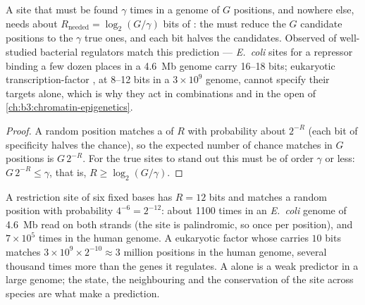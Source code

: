 \begin{proposition}\label{prop:b3:bioinformatics:bits}
A site that must be found $\gamma$ times in a genome of $G$ positions,
and nowhere else, needs about $R_{\text{needed}} = \log_{2}(G/\gamma)$
bits of : the  must reduce the $G$ candidate
positions to the $\gamma$ true ones, and each bit halves the
candidates. Observed  of well-studied bacterial regulators match
this prediction --- \emph{E.~coli} sites for a repressor binding a few
dozen places in a \qty{4.6}{Mb} genome carry \numrange{16}{18} bits;
eukaryotic transcription-factor , at \numrange{8}{12} bits in a
$3\times 10^{9}$ genome, cannot specify their targets alone, which is
why they act in combinations and in the open  of
\cref{ch:b3:chromatin-epigenetics}.
\end{proposition}
\begin{proof}
A random position matches a  of  $R$ with
probability about $2^{-R}$ (each bit of specificity halves the chance),
so the expected number of chance matches in $G$ positions is $G\,2^{-R}$.
For the true sites to stand out this must be of order $\gamma$ or less:
$G\,2^{-R} \le \gamma$, that is, $R \ge \log_{2}(G/\gamma)$.
\end{proof}

\begin{example}\label{ex:b3:bioinformatics:motif-numbers}
A restriction site of six fixed bases has $R = 12$ bits and matches a
random position with probability $4^{-6} = 2^{-12}$: about \num{1100}
times in an \emph{E.~coli} genome of \qty{4.6}{Mb} read on both strands
(the site is palindromic, so once per position), and $7\times 10^{5}$
times in the human genome. A eukaryotic factor whose  carries
$10$ bits matches $3\times 10^{9}\times 2^{-10} \approx 3$ million
positions in the human genome, several thousand times more than the
genes it regulates. A  alone is a weak predictor in a large
genome; the  state, the neighbouring  and the
conservation of the site across species are what make a prediction.
\end{example}

